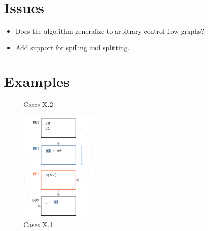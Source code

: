 \documentclass[12pt]{article}
\begin{document}
\pagebreak

\section{Issues}

\begin{itemize}
  \item Does the algorithm generalize to arbitrary control-flow graphs?
  \item Add support for spilling and splitting.
\end{itemize}

\section{Examples}

\begin{figure}[h!]
  \centering
   \hfill
  \caption{Cases X.2}
\end{figure}

\begin{figure}[h!]
  \centering
  \includegraphics[width=0.35\textwidth]{examples/case_2_1}
  \caption{Cases X.1}
\end{figure}
\end{document}
